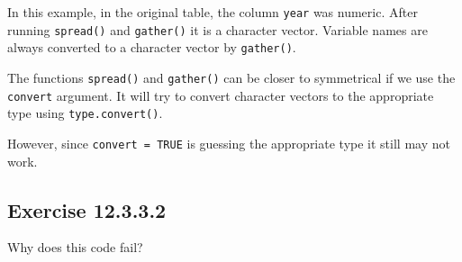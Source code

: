 \documentclass[]{book}
\newenvironment{Shaded}{\begin{snugshade}}{\end{snugshade}}
\newcommand{\CommentTok}[1]{\textcolor[rgb]{0.56,0.35,0.01}{\textit{#1}}}
\newcommand{\DataTypeTok}[1]{\textcolor[rgb]{0.13,0.29,0.53}{#1}}
\newcommand{\DecValTok}[1]{\textcolor[rgb]{0.00,0.00,0.81}{#1}}
\newcommand{\KeywordTok}[1]{\textcolor[rgb]{0.13,0.29,0.53}{\textbf{#1}}}
\newcommand{\NormalTok}[1]{#1}
\newcommand{\OperatorTok}[1]{\textcolor[rgb]{0.81,0.36,0.00}{\textbf{#1}}}
\newcommand{\OtherTok}[1]{\textcolor[rgb]{0.56,0.35,0.01}{#1}}
\newcommand{\StringTok}[1]{\textcolor[rgb]{0.31,0.60,0.02}{#1}}
\theoremstyle{plain}
\theoremstyle{remark}
\begin{document}
In this example, in the original table, the column \texttt{year} was
numeric. After running \texttt{spread()} and \texttt{gather()} it is a
character vector. Variable names are always converted to a character
vector by \texttt{gather()}.

The functions \texttt{spread()} and \texttt{gather()} can be closer to
symmetrical if we use the \texttt{convert} argument. It will try to
convert character vectors to the appropriate type using
\texttt{type.convert()}.

\begin{Shaded}
\end{Shaded}

However, since \texttt{convert\ =\ TRUE} is guessing the appropriate
type it still may not work.

\hypertarget{exercise-12.3.3.2}{%
\subsection*{\texorpdfstring{Exercise
{12.3.3.2}}{Exercise 12.3.3.2}}\label{exercise-12.3.3.2}}

Why does this code fail?

\begin{Shaded}
\end{Shaded}
\end{document}
